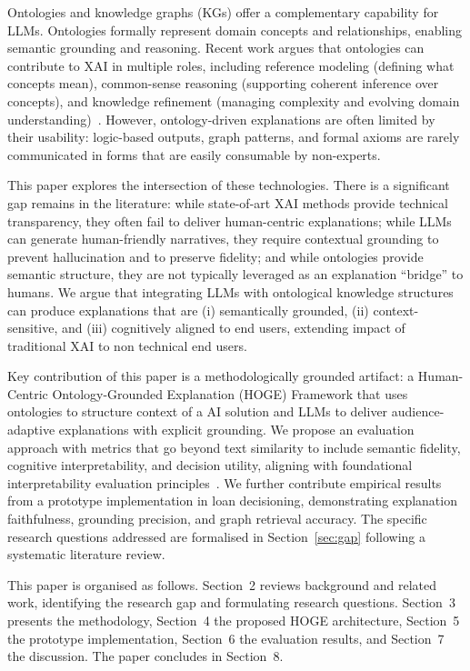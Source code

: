 \documentclass[lnbip]{svmultln}
\begin{document}
Ontologies and knowledge graphs (KGs) offer a complementary capability for LLMs. Ontologies formally represent domain concepts and relationships, enabling semantic grounding and reasoning. Recent work argues that ontologies can contribute to XAI in multiple roles, including reference modeling (defining what concepts mean), common-sense reasoning (supporting coherent inference over concepts), and knowledge refinement (managing complexity and evolving domain understanding)~\cite{confalonieri2021}. However, ontology-driven explanations are often limited by their usability: logic-based outputs, graph patterns, and formal axioms are rarely communicated in forms that are easily consumable by non-experts.

This paper explores the intersection of these technologies. There is a significant gap remains in the literature: while state-of-art XAI methods provide technical transparency, they often fail to deliver human-centric explanations; while LLMs can generate human-friendly narratives, they require contextual grounding to prevent hallucination and to preserve fidelity; and while ontologies provide semantic structure, they are not typically leveraged as an explanation ``bridge'' to humans. We argue that integrating LLMs with ontological knowledge structures can produce explanations that are (i) semantically grounded, (ii) context-sensitive, and (iii) cognitively aligned to end users, extending impact of traditional XAI to non technical end users.

Key contribution of this paper is a methodologically grounded artifact: a Human-Centric Ontology-Grounded Explanation (HOGE) Framework that uses ontologies to structure context of a AI solution and LLMs to deliver audience-adaptive explanations with explicit grounding. We propose an evaluation approach with metrics that go beyond text similarity to include semantic fidelity, cognitive interpretability, and decision utility, aligning with foundational interpretability evaluation principles~\cite{doshi2017}. We further contribute empirical results from a prototype implementation in loan decisioning, demonstrating explanation faithfulness, grounding precision, and graph retrieval accuracy. The specific research questions addressed are formalised in Section~\ref{sec:gap} following a systematic literature review.

This paper is organised as follows. Section~2 reviews background and related work, identifying the research gap and formulating research questions. Section~3 presents the methodology, Section~4 the proposed HOGE architecture, Section~5 the prototype implementation, Section~6 the evaluation results, and Section~7 the discussion. The paper concludes in Section~8.
\end{document}
